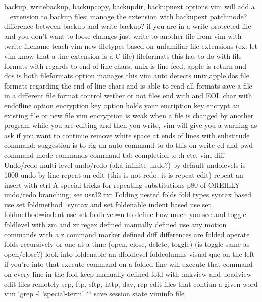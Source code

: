 \documentclass[12pt]{book}
\begin{document}
{      backup, writebackup, backupcopy, backupdir, backupnext options
      vim will add a ~ extension to backup files; manage the extension with backupext
      patchmode?
      difference between backup and write backup?
      if you are in a write protected file and you don't want to loose changes just write to another file from vim with :write filename
    teach vim new filetypes based on unfamiliar file extensions (ex. let vim know that a .inc extension is a C file)
    fileformats
      this has to do with file formats with regards to end of line chars; unix is line feed, apple is return and dos is both
      fileformats option manages this
      vim auto detects unix,apple,dos file formats regarding the end of line chars and is able to read all formats
      save a file in a different file format
    control wether or not files end with and EOL char with endofline option
    encryption
      key option holds your encription key
      encrypt an existing file or new file
      vim encryption is weak
    when a file is changed by another program while you are editing and then you write, vim will give you a warning as ask if you want to continue
    remove white space at ends of lines with substitude command; suggestion is to rig an auto command to do this on write
    cd and pwd command mode commands
  command tab completion :e :h etc.
  vim diff
  Undo/redo
    multi level undo/redo (aka infinite undo?)
      by default undolevels is 1000
    undo by line
    repeat an edit (this is not redo; it is repeat edit)
    repeat an insert with ctrl-A
    special tricks for repeating substitutions p80 of OREILLY
    undo/redo branching; see usr32.txt
  Folding
    nested folds
    fold types
      syntax based
        use set foldmethod=syntax and set foldenable
      indent based
        use set foldmethod=indent
        use set foldlevel=n to define how much you see and toggle foldlevel with zm and zr
      regex defined
      manually defined
        use any motion commands with a z command
      marker defined
      diff differences are folded
    operate folds recursively or one at a time (open, close, delete, toggle) (is toggle same as open/close?)
    look into foldenable an dfoldlevel
    foldcolumns visual que on the left if you're into that
    execute command on a folded line will execute that command on every line in the fold
    keep manually defined fold with :mkview and :loadview
  edit files remotely
    scp, ftp, sftp, http, dav, rcp
  edit files that contian a given word
    vim `grep -l 'special-term' *`
  save session state
    viminfo file
}
\end{document}
